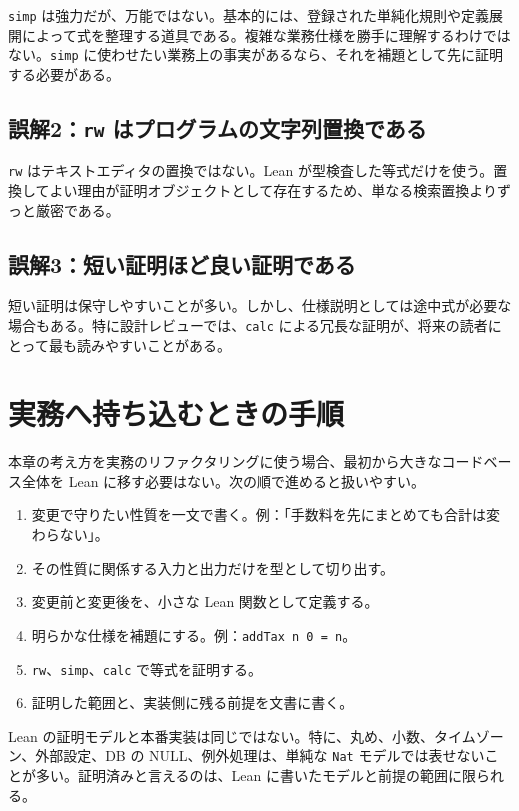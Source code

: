 \texttt{simp} は強力だが、万能ではない。基本的には、登録された単純化規則や定義展開によって式を整理する道具である。複雑な業務仕様を勝手に理解するわけではない。\texttt{simp} に使わせたい業務上の事実があるなら、それを補題として先に証明する必要がある。

\subsection{誤解2：\texttt{rw} はプログラムの文字列置換である}

\texttt{rw} はテキストエディタの置換ではない。Lean が型検査した等式だけを使う。置換してよい理由が証明オブジェクトとして存在するため、単なる検索置換よりずっと厳密である。

\subsection{誤解3：短い証明ほど良い証明である}

短い証明は保守しやすいことが多い。しかし、仕様説明としては途中式が必要な場合もある。特に設計レビューでは、\texttt{calc} による冗長な証明が、将来の読者にとって最も読みやすいことがある。

\section{実務へ持ち込むときの手順}

本章の考え方を実務のリファクタリングに使う場合、最初から大きなコードベース全体を Lean に移す必要はない。次の順で進めると扱いやすい。

\begin{enumerate}
\item 変更で守りたい性質を一文で書く。例：「手数料を先にまとめても合計は変わらない」。
\item その性質に関係する入力と出力だけを型として切り出す。
\item 変更前と変更後を、小さな Lean 関数として定義する。
\item 明らかな仕様を補題にする。例：\texttt{addTax n 0 = n}。
\item \texttt{rw}、\texttt{simp}、\texttt{calc} で等式を証明する。
\item 証明した範囲と、実装側に残る前提を文書に書く。
\end{enumerate}

\begin{warningbox}
Lean の証明モデルと本番実装は同じではない。特に、丸め、小数、タイムゾーン、外部設定、DB の NULL、例外処理は、単純な \texttt{Nat} モデルでは表せないことが多い。証明済みと言えるのは、Lean に書いたモデルと前提の範囲に限られる。
\end{warningbox}

